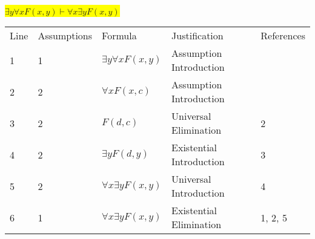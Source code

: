 \documentclass[12pt]{article}
\newcommand{\pr}[1]{\bigbreak \colorbox{Yellow}{$#1$} \smallbreak}
\begin{document}
\begin{flushleft}
\pr{\exists y \forall x F(x,y) \vdash \forall x \exists y F(x,y)}
\begin{tabular}{lllll}
    Line & Assumptions & Formula & Justification & References \\
    1 & 1 & $\exists y\forall xF(x,y)$  & Assumption Introduction &  \\
    2 & 2 & $\forall xF(x,c)$  & Assumption Introduction &  \\
    3 & 2 & $F(d,c)$  & Universal Elimination & 2 \\
    4 & 2 & $\exists yF(d,y)$  & Existential Introduction & 3 \\
    5 & 2 & $\forall x\exists yF(x,y)$  & Universal Introduction & 4 \\
    6 & 1 & $\forall x\exists yF(x,y)$  & Existential Elimination & 1, 2, 5 \\
\end{tabular}

\end{flushleft}
\end{document}
